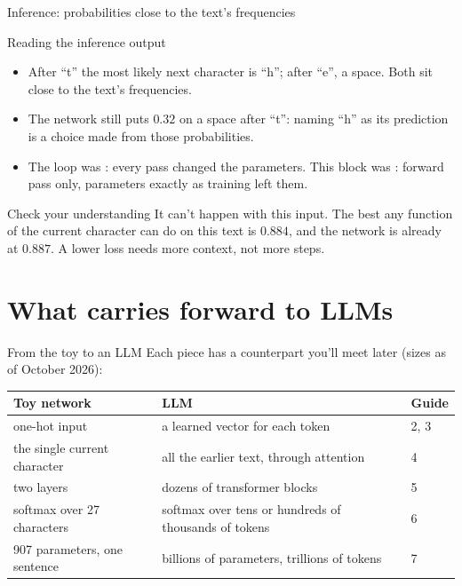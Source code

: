 \documentclass[aspectratio=169,11pt,t,\primeropts]{beamer}
\begin{document}
\begin{frame}{Inference: probabilities close to the text's frequencies}
\end{frame}

\begin{frame}{Reading the inference output}
  \begin{itemize}
    \item After ``t'' the most likely next character is ``h''; after ``e'', a space. Both sit close
      to the text's frequencies.
    \item The network still puts $0.32$ on a space after ``t'': naming ``h'' as its prediction is a
      choice made from those probabilities.
    \item The loop was : every pass changed the parameters. This block was
      : forward pass only, parameters exactly as training left them.
  \end{itemize}
\end{frame}

\begin{frame}{Check your understanding}
  {It can't happen with this input. The best any function of the current character can do on
    this text is $0.884$, and the network is already at $0.887$. A lower loss needs more
    context, not more steps.}
\end{frame}

\section{What carries forward to LLMs}

\begin{frame}{From the toy to an LLM}
  Each piece has a counterpart you'll meet later (sizes as of October 2026):
  \vspace{2mm}
  \begin{center}\small
  \begin{tabular}{@{}L{0.34\textwidth}L{0.44\textwidth}l@{}}
    \toprule
    \textbf{Toy network} & \textbf{LLM} & \textbf{Guide}\\
    \midrule
    one-hot input & a learned vector for each token & 2, 3\\
    the single current character & all the earlier text, through attention & 4\\
    two layers & dozens of transformer blocks & 5\\
    softmax over 27 characters & softmax over tens or hundreds of thousands of tokens & 6\\
    907 parameters, one sentence & billions of parameters, trillions of tokens & 7\\
    \bottomrule
  \end{tabular}
  \end{center}
\end{frame}
\end{document}
